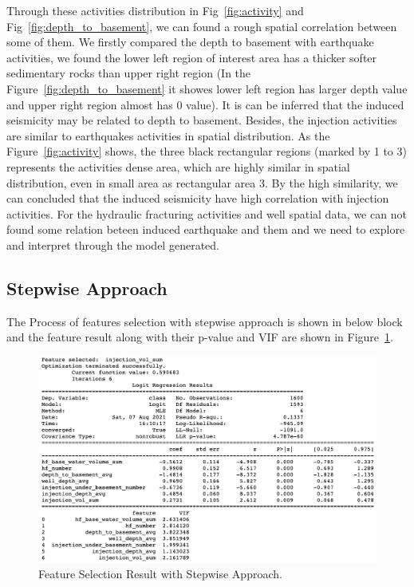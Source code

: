 \documentclass[final-report]{report-template}
\begin{document}
Through these activities distribution in Fig~\ref{fig:activity} and Fig~\ref{fig:depth_to_basement}, we can found a rough spatial correlation between some of them.
We firstly compared the depth to basement with earthquake activities, we found the lower left region of interest area has a thicker softer sedimentary rocks than upper right region (In the Figure~\ref{fig:depth_to_basement} it showes lower left region has larger depth value and upper right region almost has 0 value).
It is can be inferred that the induced seismicity may be related to depth to basement. 
Besides, the injection activities are similar to earthquakes activities in spatial distribution. 
As the Figure~\ref{fig:activity} shows, the three black rectangular regions (marked by 1 to 3) represents the activities dense area, which are highly similar in spatial distribution, even in small area as rectangular area 3. 
By the high similarity, we can concluded that the induced seismicity have high correlation with injection activities.
For the hydraulic fracturing activities and well spatial data, we can not found some relation beteen induced earthquake and them and we need to explore and interpret through the model generated.

\subsection{Stepwise Approach}
The Process of features selection with stepwise approach is shown in below block and the feature result along with their p-value and VIF are shown in Figure~\ref{fig:stepwise}.

\begin{figure}
    \begin{center}
        \includegraphics[width=1\textwidth]{stepwise.png}
    \end{center}
    \caption{\label{fig:stepwise} Feature Selection Result with Stepwise Approach.}
\end{figure}
\end{document}
